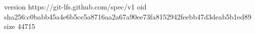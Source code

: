 version https://git-lfs.github.com/spec/v1
oid sha256:c0babb45a4e6b5ce5a8716aa2a67a90ee73fa8152942feebb47d3deab5b1ed89
size 44715

